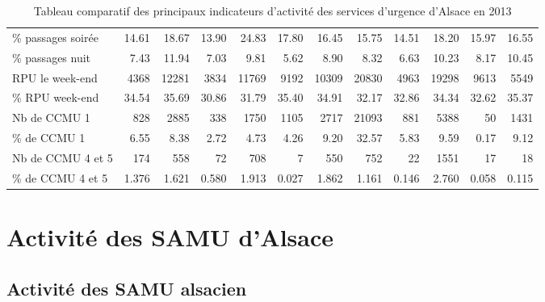\documentclass[12pt,english,french,twoside]{book}\usepackage[]{graphicx}\usepackage[]{color}
\begin{document}
\begin{landscape}
\begin{table}[ht]
\begin{tabular}{lrrrrrrrrrrr}
  \% passages soirée & 14.61 & 18.67 & 13.90 & 24.83 & 17.80 & 16.45 & 15.75 & 14.51 & 18.20 & 15.97 & 16.55 \\ 
  \% passages nuit &  7.43 & 11.94 &  7.03 &  9.81 &  5.62 &  8.90 &  8.32 &  6.63 & 10.23 &  8.17 & 10.45 \\ 
  RPU le week-end &  4368 & 12281 &  3834 & 11769 &  9192 & 10309 & 20830 &  4963 & 19298 &  9613 &  5549 \\ 
  \% RPU week-end & 34.54 & 35.69 & 30.86 & 31.79 & 35.40 & 34.91 & 32.17 & 32.86 & 34.34 & 32.62 & 35.37 \\ 
  Nb de CCMU 1 &   828 &  2885 &   338 &  1750 &  1105 &  2717 & 21093 &   881 &  5388 &    50 &  1431 \\ 
  \% de CCMU 1 &  6.55 &  8.38 &  2.72 &  4.73 &  4.26 &  9.20 & 32.57 &  5.83 &  9.59 &  0.17 &  9.12 \\ 
  Nb de CCMU 4 et 5 &  174 &  558 &   72 &  708 &    7 &  550 &  752 &   22 & 1551 &   17 &   18 \\ 
  \% de CCMU 4 et 5 & 1.376 & 1.621 & 0.580 & 1.913 & 0.027 & 1.862 & 1.161 & 0.146 & 2.760 & 0.058 & 0.115 \\ 
   \hline
\end{tabular}
\caption[Tableu de synthèse des SU]{Tableau comparatif des principaux indicateurs d'activité des services d'urgence d'Alsace en 2013} 
\label{tab:synthèse}
\end{table}


\end{landscape}





\part{Activité des SAMU d'Alsace}







\chapter{Activité des SAMU alsacien}
\end{document}
